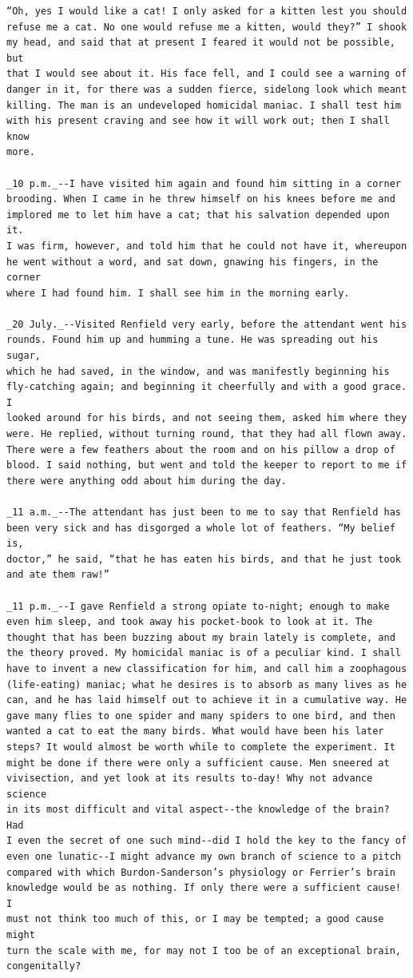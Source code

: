 \documentclass{article}
\begin{document}
\begin{verbatim}
“Oh, yes I would like a cat! I only asked for a kitten lest you should
refuse me a cat. No one would refuse me a kitten, would they?” I shook
my head, and said that at present I feared it would not be possible, but
that I would see about it. His face fell, and I could see a warning of
danger in it, for there was a sudden fierce, sidelong look which meant
killing. The man is an undeveloped homicidal maniac. I shall test him
with his present craving and see how it will work out; then I shall know
more.

_10 p.m._--I have visited him again and found him sitting in a corner
brooding. When I came in he threw himself on his knees before me and
implored me to let him have a cat; that his salvation depended upon it.
I was firm, however, and told him that he could not have it, whereupon
he went without a word, and sat down, gnawing his fingers, in the corner
where I had found him. I shall see him in the morning early.

_20 July._--Visited Renfield very early, before the attendant went his
rounds. Found him up and humming a tune. He was spreading out his sugar,
which he had saved, in the window, and was manifestly beginning his
fly-catching again; and beginning it cheerfully and with a good grace. I
looked around for his birds, and not seeing them, asked him where they
were. He replied, without turning round, that they had all flown away.
There were a few feathers about the room and on his pillow a drop of
blood. I said nothing, but went and told the keeper to report to me if
there were anything odd about him during the day.

_11 a.m._--The attendant has just been to me to say that Renfield has
been very sick and has disgorged a whole lot of feathers. “My belief is,
doctor,” he said, “that he has eaten his birds, and that he just took
and ate them raw!”

_11 p.m._--I gave Renfield a strong opiate to-night; enough to make
even him sleep, and took away his pocket-book to look at it. The
thought that has been buzzing about my brain lately is complete, and
the theory proved. My homicidal maniac is of a peculiar kind. I shall
have to invent a new classification for him, and call him a zoophagous
(life-eating) maniac; what he desires is to absorb as many lives as he
can, and he has laid himself out to achieve it in a cumulative way. He
gave many flies to one spider and many spiders to one bird, and then
wanted a cat to eat the many birds. What would have been his later
steps? It would almost be worth while to complete the experiment. It
might be done if there were only a sufficient cause. Men sneered at
vivisection, and yet look at its results to-day! Why not advance science
in its most difficult and vital aspect--the knowledge of the brain? Had
I even the secret of one such mind--did I hold the key to the fancy of
even one lunatic--I might advance my own branch of science to a pitch
compared with which Burdon-Sanderson’s physiology or Ferrier’s brain
knowledge would be as nothing. If only there were a sufficient cause! I
must not think too much of this, or I may be tempted; a good cause might
turn the scale with me, for may not I too be of an exceptional brain,
congenitally?


\end{verbatim}
\end{document}
